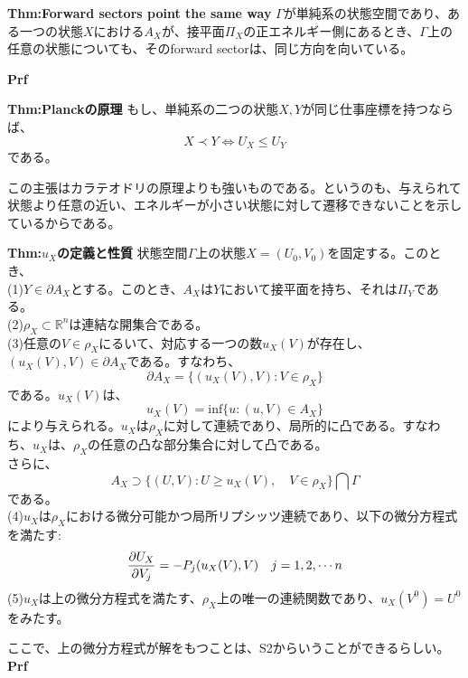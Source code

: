 \documentclass[a4paper,11pt]{jsarticle}
\numberwithin{equation}{section}
\begin{document}
\begin{itembox}[l]{\textbf{Thm:Forward sectors point the same way}}
    $\Gamma$が単純系の状態空間であり、ある一つの状態$X$における$A_X$が、接平面$\Pi_X$の正エネルギー側にあるとき、$\Gamma$上の任意の状態についても、そのforward sectorは、同じ方向を向いている。
\end{itembox}
\textbf{Prf}\\

\begin{itembox}[l]{\textbf{Thm:Planckの原理}}
    もし、単純系の二つの状態$X,Y$が同じ仕事座標を持つならば、
    \begin{equation}
        X \prec Y \Leftrightarrow U_X \leq U_Y
    \end{equation}
    である。
\end{itembox}
この主張はカラテオドリの原理よりも強いものである。というのも、与えられて状態より任意の近い、エネルギーが小さい状態に対して遷移できないことを示しているからである。\\

\begin{itembox}[l]{\textbf{Thm:$u_X$の定義と性質}}
    状態空間$\Gamma$上の状態$X=(U_0,V_0)$を固定する。このとき、\\
    (1)$Y\in \partial A_X$とする。このとき、$A_X$は$Y$において接平面を持ち、それは$\Pi_Y$である。\\
    (2)$\rho_X \subset \mathbb{R}^n $は連結な開集合である。\\
    (3)任意の$V \in \rho_X$にるいて、対応する一つの数$u_X(V)$が存在し、$(u_X(V),V) \in \partial A_X$である。すなわち、
    \begin{equation}
        \partial A_X =\{(u_X(V),V):V \in \rho_X\}
    \end{equation}
    である。$u_X(V)$は、
    \begin{equation}
        u_X(V) =\text{inf}\{u:(u,V) \in A_X \}
    \end{equation}
    により与えられる。$u_X$は$\rho_X$に対して連続であり、局所的に凸である。すなわち、$u_X$は、$\rho_X$の任意の凸な部分集合に対して凸である。\\
    さらに、
    \begin{equation}
        A_X \supset \{(U,V):U \geq u_X(V),\quad V\in \rho_X\} \bigcap \Gamma
    \end{equation}
    である。\\
    (4)$u_X$は$\rho_X$における微分可能かつ局所リプシッツ連続であり、以下の微分方程式を満たす:
    \begin{equation}
        \pdv{U_X}{V_j}(V) =-P_j (u_X(V),V) \quad j=1,2,\cdots n
    \end{equation}
    (5)$u_X$は上の微分方程式を満たす、$\rho_X$上の唯一の連続関数であり、$u_X(V^0) =U^0$をみたす。
\end{itembox}
ここで、上の微分方程式が解をもつことは、S2からいうことができるらしい。\\
\textbf{Prf}\\
\end{document}
